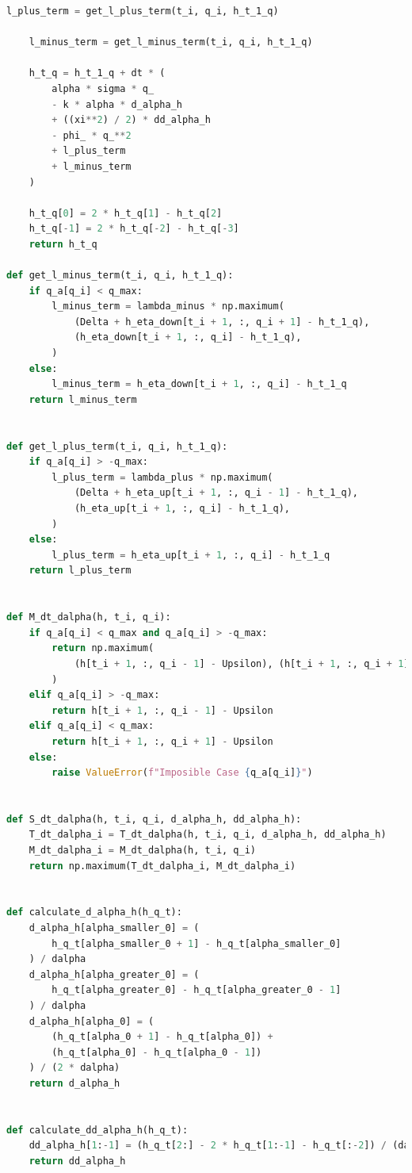 \documentclass[12pt,a4paper,spanish]{article}%
\begin{document}
\begin{appendices}
\begin{lstlisting}[language=Python]
    l_plus_term = get_l_plus_term(t_i, q_i, h_t_1_q)

    l_minus_term = get_l_minus_term(t_i, q_i, h_t_1_q)

    h_t_q = h_t_1_q + dt * (
        alpha * sigma * q_
        - k * alpha * d_alpha_h
        + ((xi**2) / 2) * dd_alpha_h
        - phi_ * q_**2
        + l_plus_term
        + l_minus_term
    )

    h_t_q[0] = 2 * h_t_q[1] - h_t_q[2]
    h_t_q[-1] = 2 * h_t_q[-2] - h_t_q[-3]
    return h_t_q

def get_l_minus_term(t_i, q_i, h_t_1_q):
    if q_a[q_i] < q_max:
        l_minus_term = lambda_minus * np.maximum(
            (Delta + h_eta_down[t_i + 1, :, q_i + 1] - h_t_1_q),
            (h_eta_down[t_i + 1, :, q_i] - h_t_1_q),
        )
    else:
        l_minus_term = h_eta_down[t_i + 1, :, q_i] - h_t_1_q
    return l_minus_term


def get_l_plus_term(t_i, q_i, h_t_1_q):
    if q_a[q_i] > -q_max:
        l_plus_term = lambda_plus * np.maximum(
            (Delta + h_eta_up[t_i + 1, :, q_i - 1] - h_t_1_q),
            (h_eta_up[t_i + 1, :, q_i] - h_t_1_q),
        )
    else:
        l_plus_term = h_eta_up[t_i + 1, :, q_i] - h_t_1_q
    return l_plus_term


def M_dt_dalpha(h, t_i, q_i):
    if q_a[q_i] < q_max and q_a[q_i] > -q_max:
        return np.maximum(
            (h[t_i + 1, :, q_i - 1] - Upsilon), (h[t_i + 1, :, q_i + 1] - Upsilon)
        )
    elif q_a[q_i] > -q_max:
        return h[t_i + 1, :, q_i - 1] - Upsilon
    elif q_a[q_i] < q_max:
        return h[t_i + 1, :, q_i + 1] - Upsilon
    else:
        raise ValueError(f"Imposible Case {q_a[q_i]}")


def S_dt_dalpha(h, t_i, q_i, d_alpha_h, dd_alpha_h):
    T_dt_dalpha_i = T_dt_dalpha(h, t_i, q_i, d_alpha_h, dd_alpha_h)
    M_dt_dalpha_i = M_dt_dalpha(h, t_i, q_i)
    return np.maximum(T_dt_dalpha_i, M_dt_dalpha_i)


def calculate_d_alpha_h(h_q_t):
    d_alpha_h[alpha_smaller_0] = (
        h_q_t[alpha_smaller_0 + 1] - h_q_t[alpha_smaller_0]
    ) / dalpha
    d_alpha_h[alpha_greater_0] = (
        h_q_t[alpha_greater_0] - h_q_t[alpha_greater_0 - 1]
    ) / dalpha
    d_alpha_h[alpha_0] = (
        (h_q_t[alpha_0 + 1] - h_q_t[alpha_0]) +
        (h_q_t[alpha_0] - h_q_t[alpha_0 - 1])
    ) / (2 * dalpha)
    return d_alpha_h


def calculate_dd_alpha_h(h_q_t):
    dd_alpha_h[1:-1] = (h_q_t[2:] - 2 * h_q_t[1:-1] - h_q_t[:-2]) / (dalpha**2)
    return dd_alpha_h



\end{lstlisting}
\end{appendices}
\end{document}
